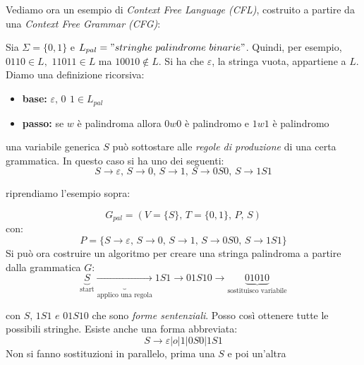 Vediamo ora un esempio di \textit{Context Free Language (CFL)}, costruito a partire da una \textit{Context Free Grammar (CFG)}:
\begin{example}
	Sia $\Sigma=\{0, 1\}$ e $L_{pal}="stringhe\,\, palindrome\,\, binarie"$.
	Quindi, per esempio, $0110\in L,\,\, 11011\in L$ ma $10010\not\in L$. Si ha che $\varepsilon$, la stringa vuota, appartiene a $L$. Diamo una definizione ricorsiva:
	\begin{itemize}
		\item \textbf{base:} $\varepsilon,\, 0\,\ 1\in L_{pal}$
		\item \textbf{passo:} se $w$ è palindroma allora $0w0$ è palindromo e $1w1$ è palindromo
	\end{itemize}
	una variabile generica $S$ può sottostare alle \textit{regole di produzione} di una certa grammatica. In questo caso si ha uno dei seguenti:
	$$S\to\varepsilon,\, S\to 0,\, S\to 1,\, S\to 0S0,\, S\to 1S1$$
\end{example}


riprendiamo l'esempio sopra:
\begin{example}
	$$G_{pal}=(V=\{S\},\, T=\{0, 1\},\, P,\, S)$$
	con:
	$$P=\{S\to\varepsilon,\, S\to 0,\, S\to 1,\, S\to 0S0,\, S\to 1S1\}$$
	Si può ora costruire un algoritmo per creare una stringa palindroma a partire dalla grammatica $G$:
	$$\underbrace{S}_{\mbox{start}}\underbrace{\to}_{\mbox{applico una regola}} 1S1 \to 01S10\to \underbrace{01010}_{\mbox{sostituisco variabile}}$$

	con $S,\, 1S1\,\, e\,\, 01S10$ che sono \textit{forme sentenziali}. Posso così ottenere tutte le possibili stringhe. Esiste anche una forma abbreviata:
	$$S\to \varepsilon|o|1|0S0|1S1$$
	Non si fanno sostituzioni in parallelo, prima una $S$ e poi un'altra
\end{example}

